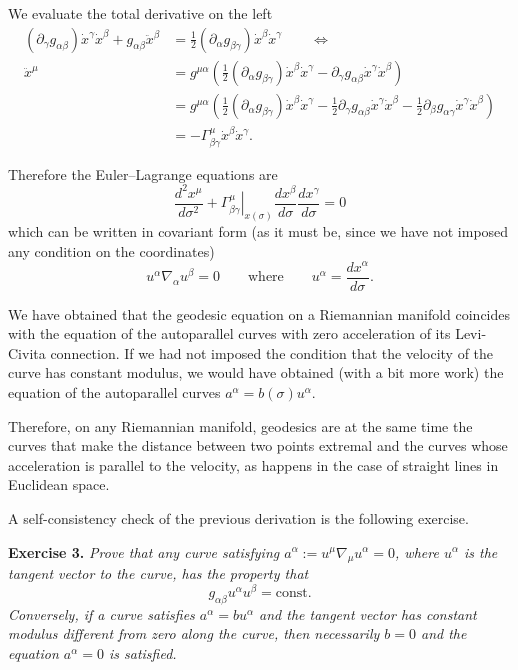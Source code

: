 \begin{points}
\item We evaluate the total derivative on the left
\begin{align*}
  (\partial_\gamma g_{\alpha\beta})\dot x^\gamma\dot x^\beta+g_{\alpha\beta}\ddot x^\beta&=\frac12(\partial_\alpha g_{\beta\gamma})\dot x^\beta\dot x^\gamma\qquad\Longleftrightarrow\\
  \ddot x^\mu&=g^{\mu\alpha}\left(\frac12(\partial_\alpha g_{\beta\gamma})\dot x^\beta\dot x^\gamma-\partial_\gamma g_{\alpha\beta}\dot x^\gamma\dot x^\beta\right)\\
  &=g^{\mu\alpha}\left(\frac12(\partial_\alpha g_{\beta\gamma})\dot x^\beta\dot x^\gamma-\frac12\partial_\gamma g_{\alpha\beta}\dot x^\gamma\dot x^\beta-\frac12\partial_\beta g_{\alpha\gamma}\dot x^\gamma\dot x^\beta\right)\\
  &=-\Gamma^\mu_{\beta\gamma}\dot x^\beta\dot x^\gamma .
\end{align*}

\item Therefore the Euler--Lagrange equations are
\[
  \frac{d^2x^\mu}{d\sigma^2}+\left.\Gamma^\mu_{\beta\gamma}\right|_{x(\sigma)}\frac{dx^\beta}{d\sigma}\frac{dx^\gamma}{d\sigma}=0
\]
which can be written in covariant form (as it must be, since we have not imposed any condition on the coordinates)
\[
  u^\alpha\nabla_\alpha u^\beta=0\qquad\text{where}\qquad u^\alpha=\frac{dx^\alpha}{d\sigma} .
\]

\item We have obtained that the geodesic equation on a Riemannian manifold coincides with the equation of the autoparallel curves with zero acceleration of its Levi-Civita connection. If we had not imposed the condition that the velocity of the curve has constant modulus, we would have obtained (with a bit more work) the equation of the autoparallel curves $a^\alpha=b(\sigma)u^\alpha$.

\item Therefore, on any Riemannian manifold, geodesics are at the same time the curves that make the distance between two points extremal and the curves whose acceleration is parallel to the velocity, as happens in the case of straight lines in Euclidean space.

\item A self-consistency check of the previous derivation is the following exercise.
\end{points}

\textbf{Exercise 3.} \emph{Prove that any curve satisfying $a^\alpha:=u^\mu\nabla_\mu u^\alpha=0$, where $u^\alpha$ is the tangent vector to the curve, has the property that
\[
  g_{\alpha\beta}u^\alpha u^\beta=\text{const}.
\]
Conversely, if a curve satisfies $a^\alpha=bu^\alpha$ and the tangent vector has constant modulus different from zero along the curve, then necessarily $b=0$ and the equation $a^\alpha=0$ is satisfied.}

